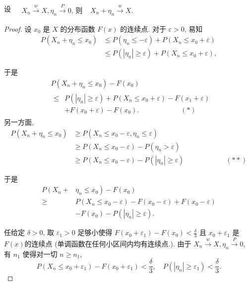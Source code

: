 \begin{theorem}
    设 $\begin{aligned} & X_n \stackrel{w}{\longrightarrow} X, \eta_n \stackrel{P}{\longrightarrow} 0 \text {, 则 }  & X_n+\eta_n \stackrel{w}{\longrightarrow} X .\end{aligned}$
\end{theorem}
{\small{
\begin{proof}
    设 $x_0$ 是 $X$ 的分布函数 $F(x)$ 的连续点. 对于 $\varepsilon>0$, 易知
$$
\begin{aligned}
P\left(X_n+\eta_n \leq x_0\right) & \leq P\left(\eta_n \leq-\varepsilon\right)+P\left(X_n \leq x_0+\varepsilon\right) \\
& \leq P\left(\left|\eta_n\right| \geq \varepsilon\right)+P\left(X_n \leq x_0+\varepsilon\right),
\end{aligned}
$$

于是
$$
\begin{aligned}
&P\left(X_n+\eta_n \leq x_0\right)-F\left(x_0\right)\\
&\begin{aligned}
\leq & P\left(\left|\eta_n\right| \geq \varepsilon\right)+P\left(X_n \leq x_0+\varepsilon\right)-F\left(x_1+\varepsilon\right) \\
& +F\left(x_0+\varepsilon\right)-F\left(x_0\right) . \qquad\qquad\qquad (*)
\end{aligned}
\end{aligned}
$$
另一方面,
$$
\begin{aligned}
P\left(X_n+\eta_n \leq x_0\right) & \geq P\left(X_n \leq x_0-\varepsilon, \eta_n \leq \varepsilon\right) \\
& \geq P\left(X_n \leq x_0-\varepsilon\right)-P\left(\eta_n>\varepsilon\right) \\
& \geq P\left(X_n \leq x_0-\varepsilon\right)-P\left(\left|\eta_n\right| \geq \varepsilon\right)\qquad\qquad\qquad (**)
\end{aligned}
$$

于是
$$
\begin{aligned}
P\left(X_n+\right. & \left.\eta_n \leq x_0\right)-F\left(x_0\right) \\
\geq & P\left(X_n \leq x_0-\varepsilon\right)-F\left(x_0-\varepsilon\right)+F\left(x_0-\varepsilon\right) \\
& -F\left(x_0\right)-P\left(\left|\eta_n\right| \geq \varepsilon\right) .
\end{aligned}
$$

任给定 $\delta>0$, 取 $\varepsilon_1>0$ 足够小使得 $F\left(x_0+\varepsilon_1\right)-F\left(x_0\right)<\frac{\delta}{3}$ 且 $x_0+\varepsilon_1$ 是 $F(x)$的连续点 (单调函数在任何小区间内均有连续点.). 由于 $X_n \stackrel{w}{\longrightarrow} X, \eta_n \stackrel{P}{\longrightarrow} 0$, 有 $n_1$ 使得对一切 $n \geq n_1$,
$$
P\left(X_n \leq x_0+\varepsilon_1\right)-F\left(x_0+\varepsilon_1\right)<\frac{\delta}{3}, \quad P\left(\left|\eta_n\right| \geq \varepsilon_1\right)<\frac{\delta}{3} .
$$


\end{proof}}}
